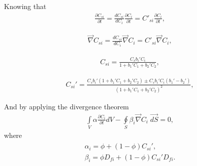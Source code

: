 \documentclass[a4paper,14pt,english]{extreport}
\begin{document}
 Knowing that
 \begin{eqnarray}
 \label{eq:variable_replace}
 \frac{\partial C_{si}}{\partial t} =  \frac{dC_{si}}{dC_{i}}\frac{\partial C_{i}}{\partial t} = C'_{si}\frac{\partial C_{i}}{\partial t},
 \end{eqnarray}
 
  \begin{eqnarray}
 \label{eq:variable_replace}
\vec\nabla C_{si} =  \frac{dC_{si}}{dC_{i}}\vec\nabla C_{i} = C'_{si}\vec\nabla C_{i},
 \end{eqnarray}
 
  \begin{eqnarray}
 \label{eq:conc_sorption}
 C_{si} =  \frac{C_{s} b_{i}' C_{i}}{1+b_{1}'C_{1}+b_{2}'C_{2}},
 \end{eqnarray}
 
  \begin{eqnarray}
 \label{eq:conc_sorption_deriv}
 C_{si}' =  \frac{C_{s}b_{i}' \left(1+b_{1}'C_{1}+b_{2}'C_{2}\right) \pm C_{s}b_{i}'C_{i} \left(b_{1}'-b_{2}'\right)}{\left(1+b_{1}'C_{1}+b_{2}'C_{2}\right)^2},
 \end{eqnarray}
 
 And by applying the divergence theorem 
  \begin{eqnarray}
 \label{eq:diffusuin_multicomp_integral}
 \int \limits_{V} \alpha \frac{\partial C_{i}}{\partial t} d V - \oint \limits_{S} \beta_{i} \vec{\nabla}C_{i} \; \vec{dS} = 0,
 \end{eqnarray}
where  
 \begin{eqnarray}
 \begin{gathered}
 \label{eq:alpha}
 \alpha_{i}  =  \phi + \left(1-\phi \right)C_{si}', \\ 
 \beta_{i}  = \phi D_{fi} + \left(1-\phi \right) C_{si}'D_{fi}.
 \end{gathered}
 \end{eqnarray}

 
\end{document}
